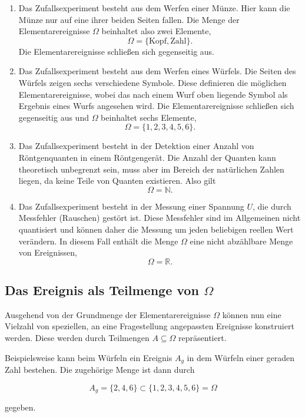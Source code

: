 \begin{enumerate}
  \item Das Zufallsexperiment besteht aus dem Werfen einer Münze. Hier kann die Münze nur auf eine ihrer beiden Seiten fallen. Die Menge der Elementarereignisse $\Omega$ beinhaltet also zwei Elemente,
  $$\Omega = \{\text{Kopf}, \text{Zahl}\}.$$
  Die Elementarereignisse schließen sich gegenseitig aus.

  \item Das Zufallsexperiment besteht aus dem Werfen eines Würfels. Die Seiten des Würfels zeigen sechs verschiedene Symbole. Diese definieren die möglichen Elementarereignisse, wobei das nach einem Wurf oben liegende Symbol als Ergebnis eines Wurfs angesehen wird. Die Elementarereignisse schließen sich gegenseitig aus und $\Omega$ beinhaltet sechs Elemente,
  $$\Omega = \{1,2,3,4,5,6\}.$$

  \item Das Zufallsexperiment besteht in der Detektion einer Anzahl von Röntgenquanten in einem Röntgengerät. Die Anzahl der Quanten kann theoretisch unbegrenzt sein, muss aber im Bereich der natürlichen Zahlen liegen, da keine Teile von Quanten existieren. Also gilt
  $$\Omega = \mathbb{N}.$$

  \item Das Zufallsexperiment besteht in der Messung einer Spannung $U$, die durch Messfehler (Rauschen) gestört ist. Diese Messfehler sind im Allgemeinen nicht quantisiert und können daher die Messung um jeden beliebigen reellen Wert verändern. In diesem Fall enthält die Menge $\Omega$ eine nicht abzählbare Menge von Ereignissen,
  $$\Omega = \mathbb{R}.$$
\end{enumerate}

\subsection{Das Ereignis als Teilmenge von $\Omega$}
\label{sec:ereignis-teilmenge}

Ausgehend von der Grundmenge der Elementarereignisse $\Omega$ können nun eine Vielzahl von speziellen, an eine Fragestellung angepassten Ereignisse konstruiert werden. Diese werden durch Teilmengen $A \subseteq \Omega$ repräsentiert.

\begin{beispiel}[Teilmenge]
Beispielsweise kann beim Würfeln ein Ereignis $A_g$ in dem Würfeln einer geraden Zahl bestehen. Die zugehörige Menge ist dann durch

$$
A_g = \{2,4,6\} \subset \{1,2,3,4,5,6\} = \Omega
$$

gegeben.
\end{beispiel}

